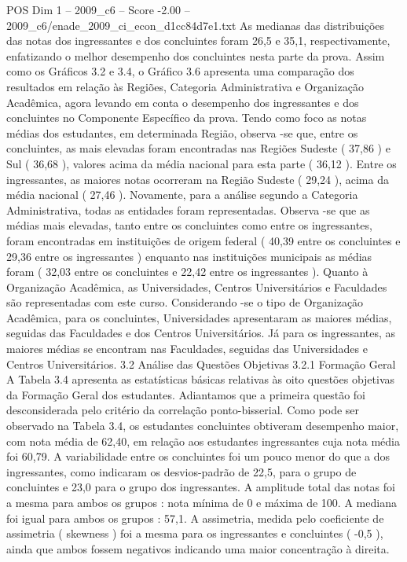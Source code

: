 \begin{textsample}{POS Dim 1 – 2009\_c6 – Score -2.00 – 2009\_c6/enade\_2009\_ci\_econ\_d1cc84d7e1.txt}
As medianas das distribuições das notas dos ingressantes e dos concluintes foram 26,5 e 35,1, respectivamente, enfatizando o melhor desempenho dos concluintes nesta parte da prova.
Assim como os Gráficos 3.2 e 3.4, o Gráfico 3.6 apresenta uma comparação dos resultados em relação às Regiões, Categoria Administrativa e Organização Acadêmica, agora levando em conta o desempenho dos ingressantes e dos concluintes no Componente Específico da prova.
Tendo como foco as notas médias dos estudantes, em determinada Região, observa -se que, entre os concluintes, as mais elevadas foram encontradas nas Regiões Sudeste ( 37,86 ) e Sul ( 36,68 ), valores acima da média nacional para esta parte ( 36,12 ).
Entre os ingressantes, as maiores notas ocorreram na Região Sudeste ( 29,24 ), acima da média nacional ( 27,46 ).
Novamente, para a análise segundo a Categoria Administrativa, todas as entidades foram representadas.
Observa -se que as médias mais elevadas, tanto entre os concluintes como entre os ingressantes, foram encontradas em instituições de origem federal ( 40,39 entre os concluintes e 29,36 entre os ingressantes ) enquanto nas instituições municipais as médias foram ( 32,03 entre os concluintes e 22,42 entre os ingressantes ).
Quanto à Organização Acadêmica, as Universidades, Centros Universitários e Faculdades são representadas com este curso.
Considerando -se o tipo de Organização Acadêmica, para os concluintes, Universidades apresentaram as maiores médias, seguidas das Faculdades e dos Centros Universitários.
Já para os ingressantes, as maiores médias se encontram nas Faculdades, seguidas das Universidades e Centros Universitários. 3.2 Análise das Questões Objetivas 3.2.1 Formação Geral A Tabela 3.4 apresenta as estatísticas básicas relativas às oito questões objetivas da Formação Geral dos estudantes.
Adiantamos que a primeira questão foi desconsiderada pelo critério da correlação ponto-bisserial.
Como pode ser observado na Tabela 3.4, os estudantes concluintes obtiveram desempenho maior, com nota média de 62,40, em relação aos estudantes ingressantes cuja nota média foi 60,79.
A variabilidade entre os concluintes foi um pouco menor do que a dos ingressantes, como indicaram os desvios-padrão de 22,5, para o grupo de concluintes e 23,0 para o grupo dos ingressantes.
A amplitude total das notas foi a mesma para ambos os grupos : nota mínima de 0 e máxima de 100.
A mediana foi igual para ambos os grupos : 57,1.
A assimetria, medida pelo coeficiente de assimetria ( skewness ) foi a mesma para os ingressantes e concluintes ( -0,5 ), ainda que ambos fossem negativos indicando uma maior concentração à direita.

\end{textsample}
